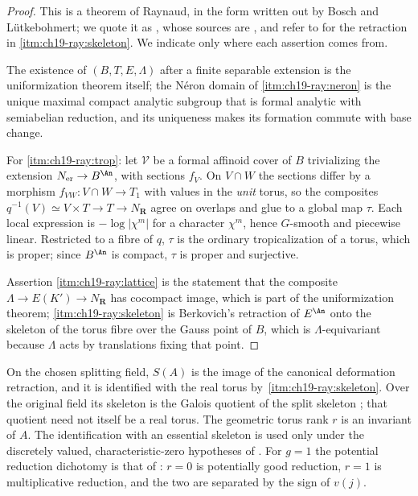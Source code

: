 \begin{proof}
This is a theorem of Raynaud, in the form written out by Bosch and
L\"utkebohmert; we quote it as
\cite[Theorem~B.5.7, \S\S B.5.8--B.5.12 and \S19.2.1--19.2.2]{CLD25}, whose
sources are \cite{BoschLutkebohmert1993}, and refer to
\cite[Chapter~6]{Berk12} for the retraction in
\cref{itm:ch19-ray:skeleton}.  We indicate only where each assertion comes
from.

The existence of $(B,T,E,\Lambda)$ after a finite separable extension is the
uniformization theorem itself; the N\'eron domain of
\cref{itm:ch19-ray:neron} is the unique maximal compact analytic subgroup
that is formal analytic with semiabelian reduction, and its uniqueness makes
its formation commute with base change.

For \cref{itm:ch19-ray:trop}: let $\mathcal V$ be a formal affinoid cover of
$B$ trivializing the extension $N_{\mathrm{er}}\to B^{\An}$, with sections
$f_V$.  On $V\cap W$ the sections differ by a morphism
$f_{VW}:V\cap W\to T_1$ with values in the \emph{unit} torus, so the
composites $q^{-1}(V)\simeq V\times T\to T\to N_{\mathbf R}$ agree on
overlaps and glue to a global map $\tau$.  Each local expression is
$-\log|\chi^m|$ for a character $\chi^m$, hence $G$-smooth and piecewise
linear.  Restricted to a fibre of $q$, $\tau$ is the ordinary
tropicalization of a torus, which is proper; since $B^{\An}$ is compact,
$\tau$ is proper and surjective.

Assertion \cref{itm:ch19-ray:lattice} is the statement that the composite
$\Lambda\to E(K')\to N_{\mathbf R}$ has cocompact image, which is part of
the uniformization theorem; \cref{itm:ch19-ray:skeleton} is Berkovich's
retraction of $E^{\An}$ onto the skeleton of the torus fibre over the Gauss
point of $B$, which is $\Lambda$-equivariant because $\Lambda$ acts by
translations fixing that point.
\end{proof}

\begin{remark}
\label{rem:ch19-skeleton-intrinsic}
On the chosen splitting field, $S(A)$ is the image of the canonical
deformation retraction, and it is identified with the real torus by
\,\cref{itm:ch19-ray:skeleton}.  Over the original
field its skeleton is the Galois quotient of the split skeleton
\cite[\S8.4.6]{BGJKK25}; that quotient need not itself be a real torus.
The geometric torus rank $r$ is an invariant of $A$.  The identification
with an essential skeleton is used only under the discretely valued,
characteristic-zero hypotheses of .
For $g=1$ the potential reduction dichotomy is that of : $r=0$ is potentially good
reduction, $r=1$ is multiplicative reduction, and the two are separated by
the sign of $v(j)$.
\end{remark}

